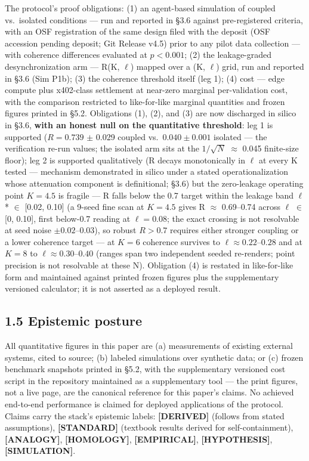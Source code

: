 \documentclass[11pt,twocolumn]{article}
\begin{document}
The protocol's proof obligations: (1) an agent-based simulation of
coupled vs.~isolated conditions --- run and reported in §3.6 against
pre-registered criteria, with an OSF registration of the same design filed with the deposit (OSF accession pending deposit; Git Release v4.5) prior to any pilot data collection --- with coherence differences evaluated at \(p < 0.001\);
(2) the leakage-graded desynchronization arm --- R(K, \(\ell\)) mapped over a
(K, \(\ell\)) grid, run and reported in §3.6 (Sim P1b); (3) the
coherence threshold itself (leg 1); (4) cost --- edge compute plus
x402-class settlement at near-zero marginal per-validation cost, with
the comparison restricted to like-for-like marginal quantities and
frozen figures printed in §5.2. Obligations (1), (2), and (3) are now
discharged in silico in §3.6, \textbf{with an honest null on the
quantitative threshold}: leg 1 is supported (\(R = 0.739\) \(\pm\) 0.029
coupled vs.~\(0.040 \pm 0.001\) isolated --- the verification re-run
values; the isolated arm sits at the \(1/\sqrt{N}\) \(\approx\) 0.045
finite-size floor); leg 2 is supported qualitatively (R decays
monotonically in \(\ell\) at every K tested --- mechanism demonstrated
in silico under a stated operationalization whose attenuation component
is definitional; \S3.6) but the zero-leakage
operating point \(K = 4.5\) is fragile --- R falls below the 0.7 target
within the leakage band \(\ell\)* \(\in\) {[}0.02, 0.10{]} (a 9-seed
fine scan at \(K = 4.5\) gives R \(\approx\) 0.69--0.74 across \(\ell\)
\(\in\) {[}0, 0.10{]}, first below-0.7 reading at \(\ell = 0.08\); the
exact crossing is not resolvable at seed noise \(\pm 0.02–0.03\)), so
robust \(R > 0.7\) requires either stronger coupling or a lower
coherence target --- at \(K = 6\) coherence survives to \(\ell \approx
0.22\text{--}0.28\) and at \(K = 8\) to \(\ell \approx
0.30\text{--}0.40\) (ranges span two independent seeded re-renders;
point precision is not resolvable at these N). Obligation (4) is
restated in like-for-like form and maintained against printed frozen
figures plus the supplementary versioned calculator; it is not asserted
as a deployed result.

\subsection*{1.5 Epistemic posture}

All quantitative figures in this paper are (a) measurements of existing
external systems, cited to source; (b) labeled simulations over
synthetic data; or (c) frozen benchmark snapshots printed in §5.2, with
the supplementary versioned cost script in the repository maintained as a
supplementary tool --- the print figures, not a live page, are the
canonical reference for this paper's claims. No achieved end-to-end
performance is claimed for deployed applications of the protocol. Claims
carry the stack's epistemic labels: \textbf{{[}DERIVED{]}} (follows from
stated assumptions), \textbf{{[}STANDARD{]}} (textbook results derived
for self-containment), \textbf{{[}ANALOGY{]}}, \textbf{{[}HOMOLOGY{]}},
\textbf{{[}EMPIRICAL{]}}, \textbf{{[}HYPOTHESIS{]}},
\textbf{{[}SIMULATION{]}}.
\end{document}

